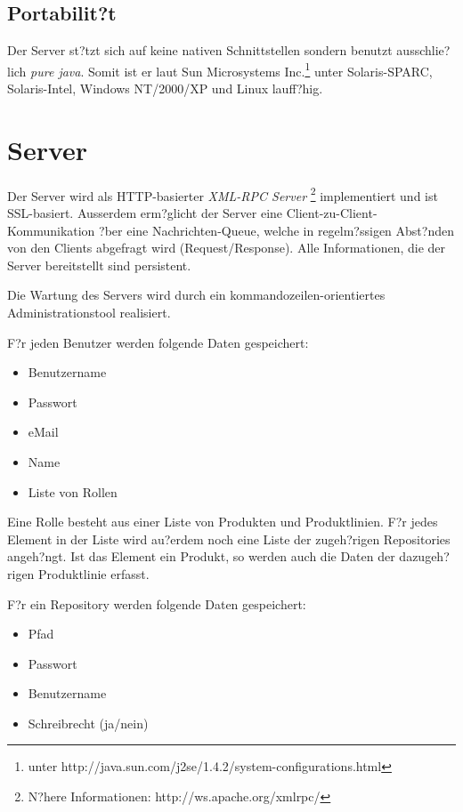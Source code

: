 \section{Portabilit?t}
Der Server st?tzt sich auf keine nativen Schnittstellen sondern benutzt ausschlie?lich 
\emph{pure java}. Somit ist er laut Sun Microsystems 
Inc.\footnote{unter http://java.sun.com/j2se/1.4.2/system-configurations.html} unter 
Solaris-SPARC, Solaris-Intel, Windows NT/2000/XP und Linux lauff?hig.


\chapter{Server}
Der Server wird als HTTP-basierter {\it XML-RPC Server}
\footnote{N?here Informationen: http://ws.apache.org/xmlrpc/}
implementiert und ist SSL-basiert. Ausserdem erm?glicht
der Server eine Client-zu-Client-Kommunikation ?ber eine Nachrichten-Queue, welche
in regelm?ssigen Abst?nden von den Clients abgefragt wird (Request/Response).
Alle Informationen, die der Server bereitstellt sind persistent.\par
Die Wartung des Servers wird durch ein kommandozeilen-orientiertes
Administrationstool realisiert.\newline

F?r jeden Benutzer werden folgende Daten gespeichert:
\begin{itemize}
\item Benutzername
\item Passwort
\item eMail
\item Name
\item Liste von Rollen
\end{itemize}

Eine Rolle besteht aus einer Liste von Produkten und Produktlinien.\newline
F?r jedes Element in der Liste wird au?erdem noch eine Liste der zugeh?rigen Repositories angeh?ngt. 
Ist das Element ein Produkt, so werden auch die Daten der dazugeh?rigen Produktlinie erfasst.\newline

F?r ein Repository werden folgende Daten gespeichert:
\begin{itemize}
\item Pfad
\item Passwort
\item Benutzername
\item Schreibrecht (ja/nein)
\end{itemize}

